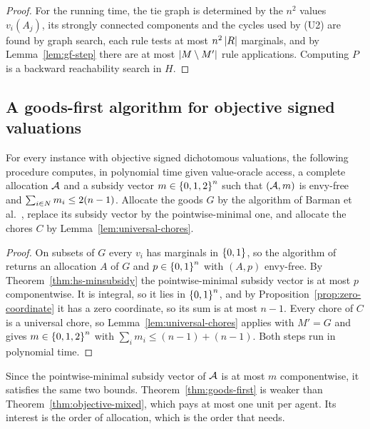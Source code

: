 \begin{proof}
For the running time, the tie graph is determined by the $n^2$ values
$v_i(A_j)$, its strongly connected components and the cycles used by (U2) are
found by graph search, each rule tests at most $n^2\left\lvert R\right\rvert$ marginals, and by
Lemma~\ref{lem:gf-step} there are at most $\left\lvert M\setminus M'\right\rvert$ rule
applications. Computing $P$ is a backward reachability search in $H$.
\end{proof}

\subsection{A goods-first algorithm for objective signed valuations}
\label{sec:gf-objective}

\begin{theorem}
\label{thm:goods-first}
For every instance with objective signed dichotomous valuations, the following
procedure computes, in polynomial time given value-oracle access, a complete
allocation $\mathcal{A}$ and a subsidy vector $m\in\left\{0,1,2\right\}^n$ such that
$(\mathcal{A},m)$ is envy-free and $\sum_{i\in N}m_i\le2(n-1)$. Allocate the
goods $G$ by the algorithm of Barman et al.~\cite{BKNS22}, replace its subsidy
vector by the pointwise-minimal one, and allocate the chores $C$ by
Lemma~\ref{lem:universal-chores}.
\end{theorem}

\begin{proof}
On subsets of $G$ every $v_i$ has marginals in $\left\{0,1\right\}$, so the algorithm
of~\cite{BKNS22} returns an allocation $A$ of $G$ and $p\in\left\{0,1\right\}^n$ with
$(A,p)$ envy-free. By Theorem~\ref{thm:hs-minsubsidy} the pointwise-minimal
subsidy vector is at most $p$ componentwise. It is integral, so it lies in
$\left\{0,1\right\}^n$, and by Proposition~\ref{prop:zero-coordinate} it has a zero
coordinate, so its sum is at most $n-1$. Every chore of $C$ is a universal chore,
so Lemma~\ref{lem:universal-chores} applies with $M'=G$ and gives
$m\in\left\{0,1,2\right\}^n$ with $\sum_i m_i\le(n-1)+(n-1)$. Both steps run in polynomial
time.
\end{proof}

Since the pointwise-minimal subsidy vector of $\mathcal{A}$ is at most $m$
componentwise, it satisfies the same two bounds. Theorem~\ref{thm:goods-first} is
weaker than Theorem~\ref{thm:objective-mixed}, which pays at most one unit per
agent. Its interest is the order of allocation, which is the order that
 needs.

